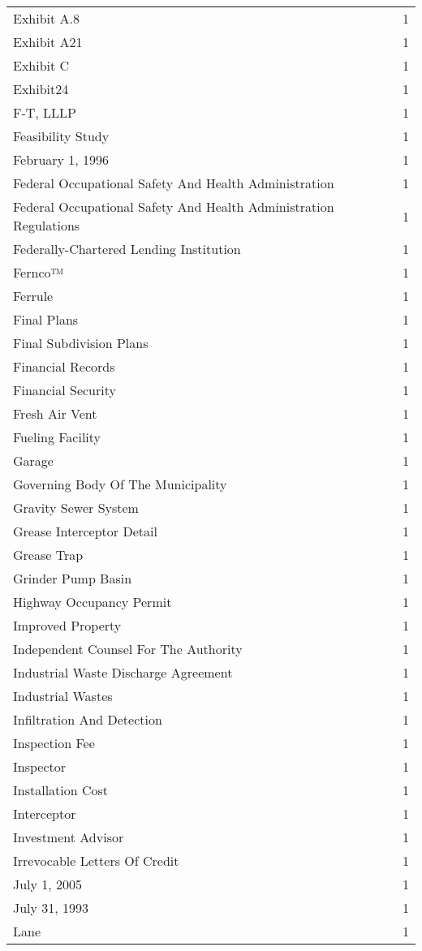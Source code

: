 \begin{longtable}{p{} p{}}
Exhibit A.8 & 1 \\
Exhibit A21 & 1 \\
Exhibit C & 1 \\
Exhibit24 & 1 \\
F-T, LLLP & 1 \\
Feasibility Study & 1 \\
February 1, 1996 & 1 \\
Federal Occupational Safety And Health Administration & 1 \\
Federal Occupational Safety And Health Administration Regulations & 1 \\
Federally-Chartered Lending Institution & 1 \\
Fernco™ & 1 \\
Ferrule & 1 \\
Final Plans & 1 \\
Final Subdivision Plans & 1 \\
Financial Records & 1 \\
Financial Security & 1 \\
Fresh Air Vent & 1 \\
Fueling Facility & 1 \\
Garage & 1 \\
Governing Body Of The Municipality & 1 \\
Gravity Sewer System & 1 \\
Grease Interceptor Detail & 1 \\
Grease Trap & 1 \\
Grinder Pump Basin & 1 \\
Highway Occupancy Permit & 1 \\
Improved Property & 1 \\
Independent Counsel For The Authority & 1 \\
Industrial Waste Discharge Agreement & 1 \\
Industrial Wastes & 1 \\
Infiltration And Detection & 1 \\
Inspection Fee & 1 \\
Inspector & 1 \\
Installation Cost & 1 \\
Interceptor & 1 \\
Investment Advisor & 1 \\
Irrevocable Letters Of Credit & 1 \\
July 1, 2005 & 1 \\
July 31, 1993 & 1 \\
Lane & 1 \\

\end{longtable}

